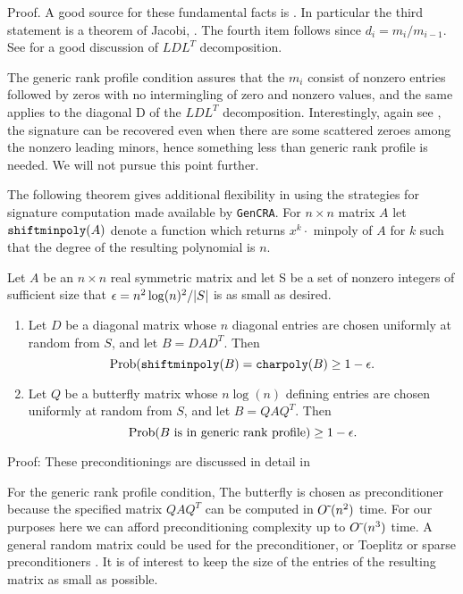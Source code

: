 \documentclass{acm_proc_article-sp}
\begin{document}
Proof.  A good source for these fundamental facts is \cite{gantmacher}.
In particular the third statement is a theorem of Jacobi, \cite[Chapter X, \S 3, theorem 2]{gantmacher}.
The fourth item follows since $d_i = m_i/m_{i-1}$.
See \cite[Chapter 4]{GoLo96} for a good discussion of $LDL^T$ decomposition.
\QED

The generic rank profile condition assures that the $m_i$ consist of nonzero entries followed
by zeros with no intermingling of zero and nonzero values, and the same applies to the 
diagonal D of the $LDL^T$ decomposition.
Interestingly, again see \cite{gantmacher}, the 
signature can be recovered even when there are some scattered zeroes among the nonzero 
leading minors, hence something less than generic rank profile is needed.  We will not
pursue this point further. 



The following theorem gives additional flexibility in using the strategies
for signature computation made available by {\tt GenCRA}.
For $n\times n$ matrix $A$
let $\mbox{\tt shiftminpoly}(A)$ denote a function which returns 
$x^k \cdot $ minpoly of $A$ for $k$ such
that the degree of the resulting polynomial is $n$.
\begin{theorem} {\label{theorem:random}}
Let $A$ be an $n\times n$ real symmetric matrix and let S be a set of nonzero
integers of sufficient size that $\epsilon = n^2 \log(n)^2/|S|$ is as small as
desired.
\begin{enumerate}
\item
Let $D$ be a diagonal matrix whose $n$ diagonal entries are chosen
uniformly at random from $S$, 
and let $B = DAD^T$.  Then $$\mbox{Prob}(\mbox{\tt shiftminpoly}(B) = \mbox{\tt charpoly}(B) \geq 1 - \epsilon.$$
\item
Let $Q$ be a butterfly matrix whose $n \log (n)$ defining entries are chosen
uniformly at random from $S$, 
and let $B=QAQ^T$.
Then $$\mbox{Prob}(B \mbox{ is in generic rank profile}) \geq 1 - \epsilon.$$
\end{enumerate}
\end{theorem}

Proof:  These preconditionings are discussed in detail in \cite{CEKSTV02} \QED

For the generic rank profile condition, The butterfly is chosen as preconditioner
because the specified matrix $QAQ^T$ can be computed in ${O\mskip1mu\tilde{\,}\mskip1mu}(n^2)$ time.  
For our purposes here we can afford preconditioning complexity up to ${O\mskip1mu\tilde{\,}\mskip1mu}(n^3)$ time.
A general random matrix could be used for the preconditioner, or Toeplitz \cite{KS91} or sparse
preconditioners \cite[Section 6]{CEKSTV02}.
It is of interest to keep the size of the entries of the resulting matrix as small as
possible.
\end{document}
